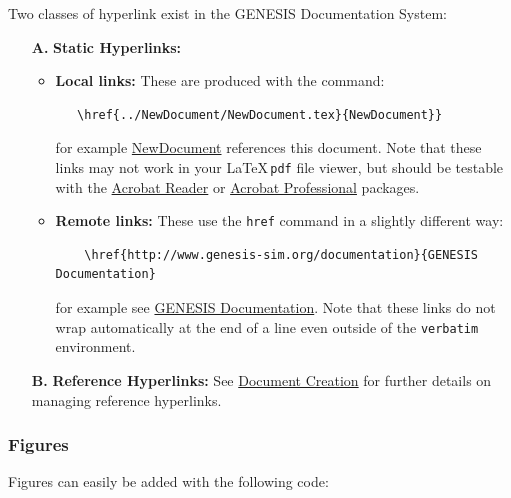 \documentclass[12pt]{article}
\begin{document}
Two classes of hyperlink exist in the GENESIS Documentation System:

\begin{itemize}
\item[{\bf A.}]{\bf Static Hyperlinks:} 
   \begin{itemize}
      \item{\bf Local links:} These are produced with the command:
\begin{verbatim}
   \href{../NewDocument/NewDocument.tex}{NewDocument}}
\end{verbatim}
for example \href{../NewDocument/NewDocument.tex}{NewDocument} references this document.
Note that these links may not work in your \LaTeX\,{\tt pdf} file viewer, but should be testable with the \href{http://get.adobe.com/reader/}{Acrobat Reader} or \href{http://www.adobe.com/products/acrobatpro/tryout.html}{Acrobat Professional} packages.
      \item {\bf Remote links:} These use the {\tt href} command in a slightly different way:
\begin{verbatim}
    \href{http://www.genesis-sim.org/documentation}{GENESIS Documentation}
\end{verbatim}
for example see \href{http://www.genesis-sim.org/documentation}{GENESIS Documentation}. Note that these links do not wrap automatically at the end of a line even outside of the {\tt verbatim} environment.
\end{itemize}

\item[{\bf B.}]{\bf Reference Hyperlinks:} See \href{../document-create/document-create.tex}{Document Creation} for further details on managing reference hyperlinks.

\end{itemize}

\subsubsection*{Figures}

Figures can easily be added with the following code:
\end{document}
